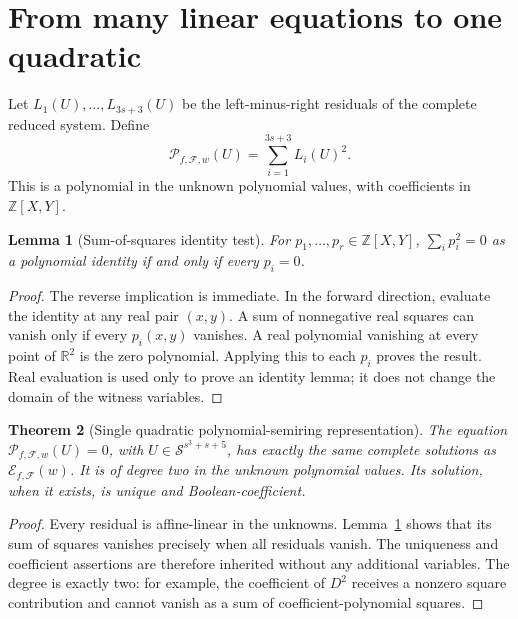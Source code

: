 \documentclass[11pt,letterpaper]{article}
\numberwithin{equation}{section}
\newtheorem{theorem}{Theorem}[section]
\newtheorem{lemma}[theorem]{Lemma}
\theoremstyle{definition}
\newcommand{\Z}{\mathbb Z}
\newcommand{\F}{\mathcal F}
\newcommand{\Sring}{\mathcal S}
\newcommand{\System}{\ensuremath{\mathcal E_{f,\F}(w)}}
\begin{document}
\section{From many linear equations to one quadratic}
\label{pwh:uh:sec:quadratic}

Let $L_1(U),\ldots,L_{3s+3}(U)$ be the left-minus-right residuals of the
complete reduced system. Define
\begin{equation}
 \mathcal P_{f,\F,w}(U)=\sum_{i=1}^{3s+3}L_i(U)^2.
 \label{pwh:uh:eq:sos}
\end{equation}
This is a polynomial in the unknown polynomial values, with coefficients
in $\Z[X,Y]$.

\begin{lemma}[Sum-of-squares identity test]
\label{pwh:uh:lem:SOS}
For $p_1,\ldots,p_r\in\Z[X,Y]$,
$\sum_i p_i^2=0$ as a polynomial identity if and only if every $p_i=0$.
\end{lemma}

\begin{proof}
The reverse implication is immediate. In the forward direction, evaluate
the identity at any real pair $(x,y)$. A sum of nonnegative real squares
can vanish only if every $p_i(x,y)$ vanishes. A real polynomial vanishing
at every point of $\mathbb R^2$ is the zero polynomial. Applying this to
each $p_i$ proves the result. Real evaluation is used only to prove an
identity lemma; it does not change the domain of the witness variables.
\end{proof}

\begin{theorem}[Single quadratic polynomial-semiring representation]
\label{pwh:uh:thm:quadratic}
The equation $\mathcal P_{f,\F,w}(U)=0$, with $U\in\Sring^{s^3+s+5}$,
has exactly the same complete solutions as \System{}. It is of degree
two in the unknown polynomial values. Its solution, when it exists, is
unique and Boolean-coefficient.
\end{theorem}

\begin{proof}
Every residual is affine-linear in the unknowns. Lemma~\ref{pwh:uh:lem:SOS}
shows that its sum of squares vanishes precisely when all residuals
vanish. The uniqueness and coefficient assertions are therefore inherited
without any additional variables. The degree is exactly two: for example,
the coefficient of $D^2$ receives a nonzero square contribution and cannot
vanish as a sum of coefficient-polynomial squares.
\end{proof}
\end{document}
